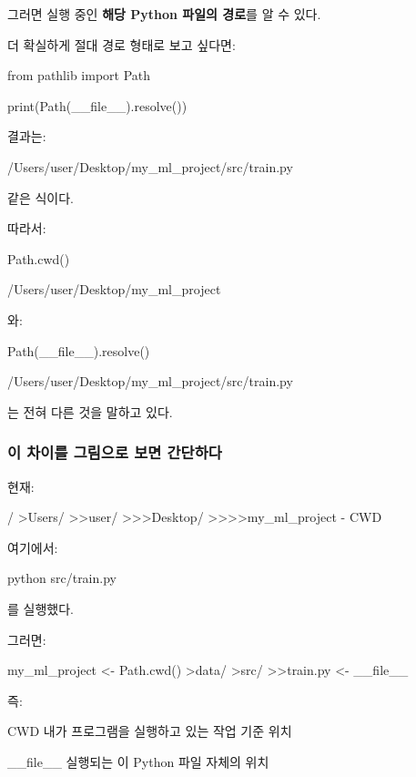 그러면 실행 중인 \textbf{해당 Python 파일의 경로}를 알 수 있다.

더 확실하게 절대 경로 형태로 보고 싶다면:

\begin{dhkcode}
from pathlib import Path

print(Path(__file__).resolve())
\end{dhkcode}

결과는:

\begin{dhkzsh}
/Users/user/Desktop/my_ml_project/src/train.py
\end{dhkzsh}

같은 식이다.

따라서:

\begin{dhkcode}
Path.cwd()

/Users/user/Desktop/my_ml_project
\end{dhkcode}

와:

\begin{dhkcode}
Path(__file__).resolve()

/Users/user/Desktop/my_ml_project/src/train.py
\end{dhkcode}

는 전혀 다른 것을 말하고 있다.

\subsubsection{이 차이를 그림으로 보면 간단하다}

현재:

\begin{dhkdir}
/
>Users/
>>user/
>>>Desktop/
>>>>my_ml_project - CWD
\end{dhkdir}

여기에서:

\begin{dhkzsh}
python src/train.py
\end{dhkzsh}

를 실행했다.

그러면:

\begin{dhkdir}
my_ml_project <- Path.cwd()
>data/
>src/
>>train.py  <- __file__
\end{dhkdir}

즉:

\begin{dhknote}
\begin{dhksmry}[centered]
CWD
내가 프로그램을 실행하고 있는 작업 기준 위치

__file__
실행되는 이 Python 파일 자체의 위치
\end{dhksmry}
\end{dhknote}

